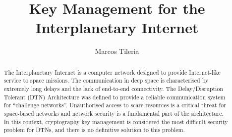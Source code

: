 \documentclass[11pt]{article} %
\title{Key Management for the Interplanetary Internet}
\author{Marcos Tileria}
\theoremstyle{plain}
\theoremstyle{definition}
\begin{document}
\maketitle

\declaration

\begin{abstract}
  The Interplanetary Internet is a computer network designed to provide Internet-like service to space missions. The communication in deep space is characterised by extremely long delays and the lack of end-to-end connectivity. The Delay/Disruption Tolerant (DTN) Architecture was defined to provide a reliable communication system for ``challenge networks''. Unauthorised access to scare resources is a critical threat for space-based networks and network security is a fundamental part of the architecture. In this context, cryptography key management is considered the most difficult security problem for DTNs, and there is no definitive solution to this problem. 
  
\end{abstract}


 \newpage


 \newpage


\newpage


 \newpage


 \newpage


 \newpage




\end{document}
